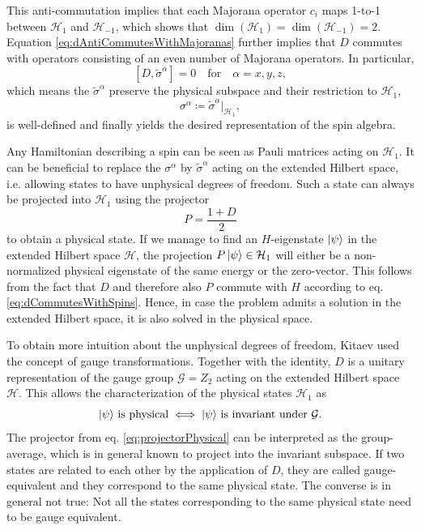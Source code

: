 \documentclass[%
fontsize=12pt, %
twoside=off %
]{scrbook}
\newcommand{\hilbert}{\mathcal{H}}
\newcommand{\for}{\quad\text{for}\quad}
\begin{document}
This anti-commutation implies that each Majorana operator $c_i$ maps 1-to-1 between $\hilbert_1$ and $\hilbert_{-1}$, which shows that $\dim(\hilbert_1) = \dim(\hilbert_{-1}) = 2$. Equation \ref{eq:dAntiCommutesWithMajoranas} further implies that $D$ commutes with operators consisting of an even number of Majorana operators. In particular,
\begin{equation}
	\left[D,\tilde\sigma^\alpha\right] = 0\for \alpha=x,y,z,
	\label{eq:dCommutesWithSpins}
\end{equation}
which means the $\tilde\sigma^\alpha$ preserve the physical subspace and their restriction to $\hilbert_1$,
\begin{equation}
	\sigma^\alpha\coloneq \tilde\sigma^\alpha \vert_{\hilbert_1},
\end{equation}
is well-defined and finally yields the desired representation of the spin algebra.

Any Hamiltonian describing  a spin can be seen as Pauli matrices acting on $\hilbert_1$. It can be beneficial to replace the $\sigma^\alpha$ by $\tilde\sigma^\alpha$ acting on the extended Hilbert space, i.e. allowing states to have unphysical degrees of freedom. Such a state can always be projected into $\hilbert_{1}$ using the projector
\begin{equation}
	P = \frac{1+D}{2}
	\label{eq:projectorPhysical}
\end{equation}
to obtain a physical state. If we manage to find an $H$-eigenstate $\ket{\psi}$ in the extended Hilbert space $\hilbert$, the projection $P \ket{\psi} \in \hilbert_1$ will either be a non-normalized physical eigenstate of the same energy or the zero-vector. This follows from the fact that $D$ and therefore also $P$ commute with $H$ according to eq. \ref{eq:dCommutesWithSpins}. Hence, in case the problem admits a solution in the extended Hilbert space, it is also solved in the physical space.

To obtain more intuition about the unphysical degrees of freedom, Kitaev used the concept of gauge transformations. Together with the identity, $D$ is a unitary representation of the gauge group $\mathcal{G}=Z_2$ acting on the extended Hilbert space $\hilbert$. This allows the characterization of the physical states $\hilbert_1$ as
\begin{equation}
	\text{$\ket{\psi}$ is physical} \iff \text{$\ket{\psi}$ is invariant under $\mathcal{G}$}.
\end{equation}
The projector from eq. \ref{eq:projectorPhysical} can be interpreted as the group-average, which is in general known to project into the invariant subspace. If two states are related to each other by the application of $D$, they are called gauge-equivalent and they correspond to the same physical state. The converse is in general not true: Not all the states corresponding to the same physical state need to be gauge equivalent.
\end{document}
